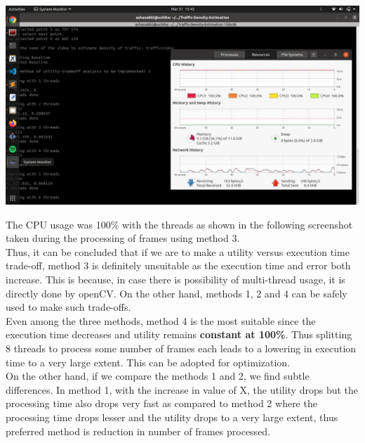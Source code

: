 \documentclass{article} %
\begin{document}
\begin{center}
    \includegraphics[scale = 0.36]{user_interface/CPU_Usage.jpeg}
\end{center}

The CPU usage was 100\% with the threads as shown in the following screenshot taken during the processing of frames using method 3.
\\Thus, it can be concluded that if we are to make a utility versus execution time trade-off, method 3 is definitely unsuitable as the execution time and error both increase. This is because, in case there is possibility of multi-thread usage, it is directly done by openCV. On the other hand, methods 1, 2 and 4 can be safely used to make such trade-offs.
\\Even among the three methods, method 4 is the most suitable since the execution time decreases and utility remains \textbf{constant at 100\%}. Thus splitting 8 threads to process some number of frames each leads to a lowering in execution time to a very large extent. This can be adopted for optimization.
\\On the other hand, if we compare the methods 1 and 2, we find subtle differences. In method 1, with the increase in value of X, the utility drops but the processing time also drops very fast as compared to method 2 where the processing time drops lesser and the utility drops to a very large extent, thus preferred method is reduction in number of frames processed.
\end{document}
